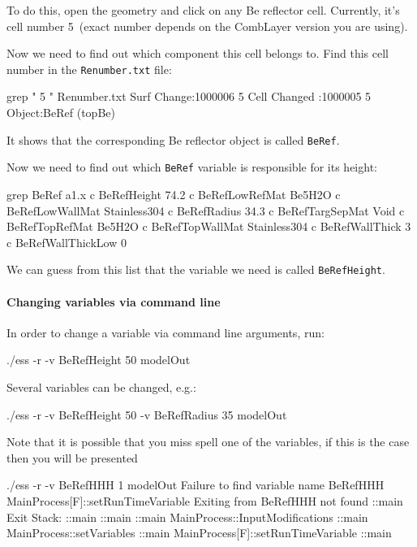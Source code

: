 To do this, open the \mcnp geometry and click on any Be reflector cell. Currently, it's cell number 5~(exact number depends on the
CombLayer version you are using).

Now we need to find out which component this cell belongs to.  Find this cell number in the {\tt Renumber.txt} file:
\begin{bash}
grep " 5 " Renumber.txt 
Surf Change:1000006 5                                                           
Cell Changed :1000005 5 Object:BeRef (topBe)       
\end{bash}
It shows that the corresponding Be reflector object is called {\tt BeRef}.

Now we need to find out which {\tt BeRef} variable is responsible for its height:
\begin{bash}
grep BeRef a1.x 
c BeRefHeight 74.2
c BeRefLowRefMat Be5H2O
c BeRefLowWallMat Stainless304
c BeRefRadius 34.3
c BeRefTargSepMat Void
c BeRefTopRefMat Be5H2O
c BeRefTopWallMat Stainless304
c BeRefWallThick 3
c BeRefWallThickLow 0
\end{bash}

We can guess from this list that the variable we need is called {\tt BeRefHeight}.

\paragraph[Command line]{Changing variables via command line}
In order to change a variable via command line arguments, run:
\begin{bash}
  ./ess -r -v BeRefHeight 50 modelOut
\end{bash}
Several variables can be changed, e.g.:
\begin{bash}
  ./ess -r -v BeRefHeight 50 -v BeRefRadius 35 modelOut
\end{bash}

Note that it is possible that you miss spell one of the variables, if this is the case then
you will be presented 

\begin{bash}
./ess -r -v BeRefHHH 1 modelOut
Failure to find variable name BeRefHHH                                          MainProcess[F]::setRunTimeVariable
Exiting from BeRefHHH not found                                                 ::main
Exit Stack:                                                                     ::main
::main                                                                          ::main
  MainProcess::InputModifications                                               ::main
    MainProcess::setVariables                                                   ::main
      MainProcess[F]::setRunTimeVariable                                        ::main
\end{bash}

